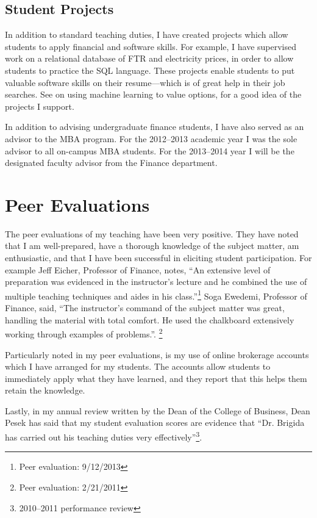 \documentclass[12pt]{article}
\begin{document}
\subsection{Student Projects}

In addition to standard teaching duties, I have created projects which allow students to apply financial and software skills.  For example, I have supervised work on a relational database of FTR and electricity prices, in order to allow students to practice the SQL language.  These projects enable students to put valuable software skills on their resume---which is of great help in their job searches.  See \href{https://www.youtube.com/watch?v=XuW_M5iwNEk}{\color{Blue}{this student research presentation}} on using machine learning to value options, for a good idea of the projects I support.

In addition to advising undergraduate finance students, I have also served as an advisor to the MBA program.  For the 2012--2013 academic year I was the sole advisor to all on-campus MBA students.  For the 2013--2014 year I will be the designated faculty advisor from the Finance department.

\section{Peer Evaluations}
The peer evaluations of my teaching have been very positive.  They have noted that I am well-prepared, have a thorough knowledge of the subject matter, am enthusiastic, and that I have been successful in eliciting student participation.  For example Jeff Eicher, Professor of Finance, notes, ``An extensive level of preparation was evidenced in the instructor's lecture and he combined the use of multiple teaching techniques and aides in his class.''\footnote{Peer evaluation: 9/12/2013} Soga Ewedemi, Professor of Finance, said, ``The instructor's command of the subject matter was great, handling the material with total comfort. He used the chalkboard extensively working through examples of problems.''. \footnote{Peer evaluation: 2/21/2011}

Particularly noted in my peer evaluations, is my use of online brokerage accounts which I have arranged for my students.  The accounts allow students to immediately apply what they have learned, and they report that this helps them retain the knowledge.

Lastly, in my annual review written by the Dean of the College of Business, Dean Pesek has said that my student evaluation scores are evidence that ``Dr. Brigida has carried out his teaching duties very effectively''\footnote{2010--2011 performance review}.  
\end{document}

